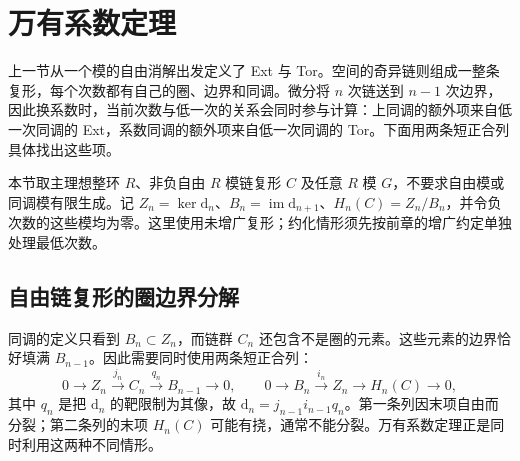 
% 
% 

\section{万有系数定理}
\label{g2:sec:0402}

上一节从一个模的自由消解出发定义了 Ext 与 Tor。空间的奇异链则组成一整条复形，每个次数都有自己的圈、边界和同调。微分将 \(n\) 次链送到 \(n-1\) 次边界，因此换系数时，当前次数与低一次的关系会同时参与计算：上同调的额外项来自低一次同调的 Ext，系数同调的额外项来自低一次同调的 Tor。下面用两条短正合列具体找出这些项。

\ProseParagraphBreak

本节取主理想整环 \(R\)、非负自由 \(R\) 模链复形 \(C\) 及任意 \(R\) 模 \(G\)，不要求自由模或同调模有限生成。记 \(Z_n=\ker\mathrm{d}_n\)、\(B_n=\operatorname{im}\mathrm{d}_{n+1}\)、\(H_n(C)=Z_n/B_n\)，并令负次数的这些模均为零。这里使用未增广复形；约化情形须先按前章的增广约定单独处理最低次数。

\subsection{自由链复形的圈边界分解}
\label{g2:subsec:0402:01}
同调的定义只看到 \(B_n\subset Z_n\)，而链群 \(C_n\) 还包含不是圈的元素。这些元素的边界恰好填满 \(B_{n-1}\)。因此需要同时使用两条短正合列：
\begin{equation}\label{g2:eq:cycles-boundaries-sequences}
	0\longrightarrow Z_n\xrightarrow{j_n}C_n\xrightarrow{q_n}B_{n-1}\longrightarrow0,
	\qquad
	0\longrightarrow B_n\xrightarrow{i_n}Z_n\longrightarrow H_n(C)\longrightarrow0,
\end{equation}
其中 \(q_n\) 是把 \(\mathrm{d}_n\) 的靶限制为其像，故 \(\mathrm{d}_n=j_{n-1}i_{n-1}q_n\)。第一条列因末项自由而分裂；第二条列的末项 \(H_n(C)\) 可能有挠，通常不能分裂。万有系数定理正是同时利用这两种不同情形。


